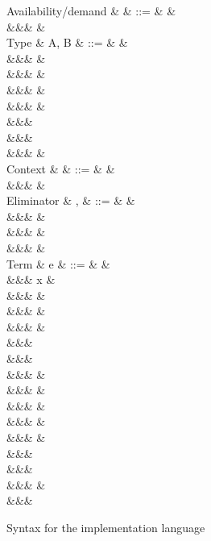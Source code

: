 \begin{figure}
\begin{syntaxfig}
\mbox{Availability/demand}
&
\alpha
&
::=
&
\top
&
\\
&&&
\bot
&
\\[2mm]
\mbox{Type}
&
A, B
&
::=
&
\bot
&
\\
&&&
\tyBool
&
\\
&&&
\tyInt
&
\\
&&&
\tyList
&
\\
&&&
&
\\
&&&
\\
&&&
\\
&&&
&
\\[2mm]
\mbox{Context}
&
\Gamma
&
::=
&
\cxtEmpty
&
\\
&&&
&
\\[2mm]
\mbox{Eliminator}
&
\sigma, \tau
&
::=
&
&
\\
&&&
&
\\
&&&
&
\\
&&&
&
\\[2mm]
\mbox{Term}
&
e
&
::=
&
\bot
&
\\
&&&
x
&
\\
&&&
\exTrue \mid \exFalse
&
\\
&&&
&
\\
&&&
&
\\
&&&
\\
&&&
\\
&&&
&
\\
&&&
&
\\
&&&
&
\\
&&&
\exNil
&
\\
&&&
&
\\
&&&
\\
&&&
\\
&&&
&
\\
&&&
\end{syntaxfig}
\caption{Syntax for the implementation language}
\label{fig:impl-language:syntax}
\end{figure}
